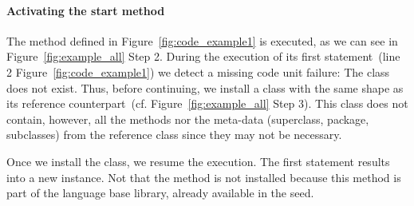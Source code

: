 \paragraph{Activating the start method}
The method  defined in Figure~\ref{fig:code_example1} is executed, as we can see in Figure~\ref{fig:example_all} Step 2. During the execution of its first statement~(line 2 Figure~\ref{fig:code_example1}) we detect a missing code unit failure: The  class does not exist. Thus, before continuing, we install a  class with the same shape as its reference counterpart~(cf. Figure~\ref{fig:example_all} Step 3). This class does not contain, however, all the methods nor the meta-data (\eg superclass, package, subclasses) from the reference class since they may not be necessary.





Once we install the  class, we resume the execution. The first statement results into a new  instance. Not that the  method is not installed because this method is part of the language base library, already available in the seed. 

